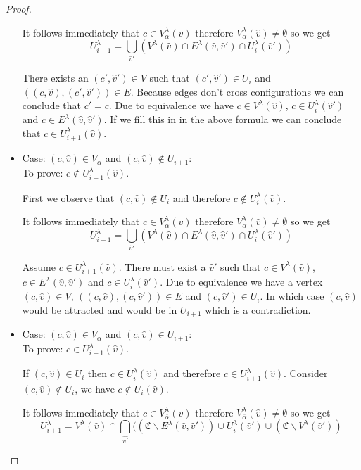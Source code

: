 \begin{lemma}
\begin{proof}
\begin{itemize}
			
			It follows immediately that $c \in V^\lambda_{\alpha}(\hat{v})$ therefore $V^\lambda_{\alpha}(\hat{v}) \neq \emptyset$ so we get
			\[ U^\lambda_{i+1} =\bigcup_{\hat{v}'} (V^\lambda(\hat{v}) \cap E^\lambda(\hat{v},\hat{v}') \cap U^\lambda_i(\hat{v}')) \]
			
			There exists an $(c',\hat{v}') \in V$ such that $(c',\hat{v}') \in U_i$ and $((c,\hat{v}),(c',\hat{v}')) \in E$. Because edges don't cross configurations we can conclude that $c' = c$. Due to equivalence we have $c \in V^\lambda(\hat{v})$, $c \in U^\lambda_i(\hat{v}')$ and $c \in E^\lambda(\hat{v},\hat{v}')$. If we fill this in in the above formula we can conclude that $c \in U^\lambda_{i+1}(\hat{v})$.
			\item Case: $(c, \hat{v}) \in V_{\alpha}$ and $(c,\hat{v}) \notin U_{i+1}$:\\
			To prove: $c \notin U^\lambda_{i+1}(\hat{v})$.
			
			
			First we observe that $(c,\hat{v}) \notin U_i$ and therefore $c \notin U^\lambda_i(\hat{v})$.
			
			It follows immediately that $c \in V^\lambda_{\alpha}(\hat{v})$ therefore $V^\lambda_{\alpha}(\hat{v}) \neq \emptyset$ so we get
			\[ U^\lambda_{i+1} =\bigcup_{\hat{v}'} (V^\lambda(\hat{v}) \cap E^\lambda(\hat{v},\hat{v}') \cap U^\lambda_i(\hat{v}')) \]
			
			Assume $c \in U^\lambda_{i+1}(\hat{v})$. There must exist a $\hat{v}'$ such that $c \in V^\lambda(\hat{v})$, $c \in E^\lambda(\hat{v},\hat{v}')$ and $c \in U^\lambda_i(\hat{v}')$. Due to equivalence we have a vertex $(c,\hat{v}) \in V$, $((c,\hat{v}),(c,\hat{v}')) \in E$ and $(c,\hat{v}') \in U_i$. In which case $(c,\hat{v})$ would be attracted and would be in $U_{i+1}$ which is a contradiction.
			\item Case: $(c, \hat{v}) \in V_{\overline{\alpha}}$ and $(c,\hat{v}) \in U_{i+1}$:\\
			To prove: $c \in U^\lambda_{i+1}(\hat{v})$.
			
			If $(c,\hat{v}) \in U_i$ then $c \in U^\lambda_i(\hat{v})$ and therefore $c \in U^\lambda_{i+1}(\hat{v})$. Consider $(c,\hat{v}) \notin U_i$, we have $c \notin U_i(\hat{v})$.
			
			It follows immediately that $c \in V^\lambda_{\overline{\alpha}}(\hat{v})$ therefore $V^\lambda_{\overline{\alpha}}(\hat{v}) \neq \emptyset$ so we get
			\[ U^\lambda_{i+1} =V^\lambda(\hat{v}) \cap \bigcap_{\hat{v'}}((\mathfrak{C} \backslash E^\lambda(\hat{v},\hat{v}')) \cup U^\lambda_i(\hat{v}') \cup (\mathfrak{C}\backslash V^\lambda(\hat{v}')) \]
			

\end{itemize}
\end{proof}
\end{lemma}

